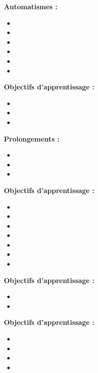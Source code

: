 \par\noindent\textbf{Automatismes :}
\begin{itemize}
    \item \useaut[C3B3da]
    \item \useaut[C3B3db]
    \item \useaut[C3B3dc]
    \item \useaut[C3B3dd]
    \item \useaut[C3B3de]
    \item \useaut[C3E3aa]
\end{itemize}
\par\noindent\textbf{Objectifs d'apprentissage :}
\begin{itemize}
    \item \useobj[C3B3db]
    \item \useobj[C3B3da]
    \item \useobj[C3B3dc]
\end{itemize}
\par\noindent\textbf{Prolongements :}
\begin{itemize}
    \item \usepro[C3A3ad]
    \item \usepro[C3B3da]
    \item \usepro[C3B3db]
\end{itemize}
\endsequence

\par\noindent\textbf{Objectifs d'apprentissage :}
\begin{itemize}
    \item \useobj[C3D3aa]
    \item \useobj[C3D3ab]
    \item \useobj[C3D3ac]
    \item \useobj[C3D3ad]
    \item \useobj[C3D3ba]
    \item \useobj[C3D3bb]
    \item \useobj[C3D3bc]
\end{itemize}
\endsequence

\par\noindent\textbf{Objectifs d'apprentissage :}
\begin{itemize}
    \item \useobj[C3A3ca]
    \item \useobj[C3A3cb]
\end{itemize}
\endsequence

\par\noindent\textbf{Objectifs d'apprentissage :}
\begin{itemize}
    \item \useobj[C3F3aa]
    \item \useobj[C3F3ab]
    \item \useobj[C3F3ac]
    \item \useobj[C3F3ad]
\end{itemize}
\endsequence

\endlevel

\endlevel
